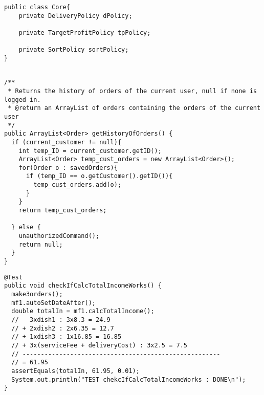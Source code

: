 \begin{lstlisting}[caption=Aggregation applied to the \Core~and its policies.,
  label=lst:aggregationCore]
public class Core{
    private DeliveryPolicy dPolicy;
    
    private TargetProfitPolicy tpPolicy;
    
    private SortPolicy sortPolicy;
}
  
\end{lstlisting}


\begin{lstlisting}[caption=Application of the \texttt{current\_customer}
  concept to \texttt{getHistoryOfOrders}.,
  label=lst:historyOfOrders]
/**
 * Returns the history of orders of the current user, null if none is logged in.
 * @return an ArrayList of orders containing the orders of the current user
 */
public ArrayList<Order> getHistoryOfOrders() {
  if (current_customer != null){
    int temp_ID = current_customer.getID();
    ArrayList<Order> temp_cust_orders = new ArrayList<Order>();
    for(Order o : savedOrders){
      if (temp_ID == o.getCustomer().getID()){
        temp_cust_orders.add(o);
      }
    }
    return temp_cust_orders;
    
  } else {
    unauthorizedCommand();
    return null;
  }
}
\end{lstlisting}

\begin{lstlisting}[caption=Example of a test using \texttt{assertEquals} with 2 decimal precision.,
  label=lst:test_total_income]
@Test
public void checkIfCalcTotalIncomeWorks() {
  make3orders();
  mf1.autoSetDateAfter();
  double totalIn = mf1.calcTotalIncome();
  //   3xdish1 : 3x8.3 = 24.9
  // + 2xdish2 : 2x6.35 = 12.7
  // + 1xdish3 : 1x16.85 = 16.85
  // + 3x(serviceFee + deliveryCost) : 3x2.5 = 7.5
  // ------------------------------------------------------
  // = 61.95
  assertEquals(totalIn, 61.95, 0.01);
  System.out.println("TEST chekcIfCalcTotalIncomeWorks : DONE\n");
}
\end{lstlisting}

